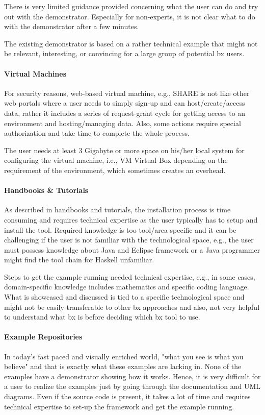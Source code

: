 There is very limited guidance provided concerning what the user can do and try out with the demonstrator. Especially for non-experts, it is not clear what to do with the demonstrator after a few minutes.

The existing demonstrator is based on a rather technical example that might not be relevant, interesting, or convincing for a large group of potential bx users.

\paragraph{Virtual Machines}
For security reasons, web-based virtual machine, e.g., SHARE is not like other web portals where a user needs to simply sign-up and can host/create/access data, rather it includes a series of request-grant cycle for getting access to an environment and hosting/managing data. Also, some actions require special authorization and take time to complete the whole process.

The user needs at least 3 Gigabyte or more space on his/her local system for configuring the virtual machine, i.e., VM Virtual Box depending on the requirement of the environment, which sometimes creates an overhead.

\paragraph{Handbooks \& Tutorials}
As described in handbooks and tutorials, the installation process is time consuming and requires technical expertise as the user typically has to setup and install the tool. Required knowledge is too tool/area specific and it can be challenging if the user is not familiar with the technological space, e.g., the user must possess knowledge about Java and Eclipse framework or a Java programmer might find the tool chain for Haskell unfamiliar.

Steps to get the example running needed technical expertise, e.g., in some cases, domain-specific knowledge includes mathematics and specific coding language. What is showcased and discussed is tied to a specific technological space and might not be easily transferable to other bx approaches and also, not very helpful to understand what bx is before deciding which bx tool to use.

\paragraph{Example Repositories}
In today's fast paced and visually enriched world, "what you see is what you believe" and that
is exactly what these examples are lacking in. None of the examples have a demonstrator
showing how it works. Hence, it is very difficult for a user to realize the examples just by going
through the documentation and UML diagrams. Even if the source code is present, it takes a lot
of time and requires technical expertise to set-up the framework and get the example running.

